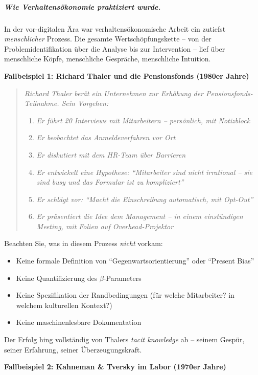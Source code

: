 \subparagraph{Wie Verhaltensökonomie praktiziert wurde.}

In der vor-digitalen Ära war verhaltensökonomische Arbeit ein zutiefst \textit{menschlicher} Prozess. Die gesamte Wertschöpfungskette -- von der Problemidentifikation über die Analyse bis zur Intervention -- lief über menschliche Köpfe, menschliche Gespräche, menschliche Intuition.

\textbf{Fallbeispiel 1: Richard Thaler und die Pensionsfonds (1980er Jahre)}

\begin{quote}
\textit{Richard Thaler berät ein Unternehmen zur Erhöhung der Pensionsfonds-Teilnahme. Sein Vorgehen:}
\begin{enumerate}
    \item \textit{Er führt 20 Interviews mit Mitarbeitern -- persönlich, mit Notizblock}
    \item \textit{Er beobachtet das Anmeldeverfahren vor Ort}
    \item \textit{Er diskutiert mit dem HR-Team über Barrieren}
    \item \textit{Er entwickelt eine Hypothese: ``Mitarbeiter sind nicht irrational -- sie sind busy und das Formular ist zu kompliziert''}
    \item \textit{Er schlägt vor: ``Macht die Einschreibung automatisch, mit Opt-Out''}
    \item \textit{Er präsentiert die Idee dem Management -- in einem einstündigen Meeting, mit Folien auf Overhead-Projektor}
\end{enumerate}
\end{quote}

Beachten Sie, was in diesem Prozess \textit{nicht} vorkam:
\begin{itemize}
    \item Keine formale Definition von ``Gegenwartsorientierung'' oder ``Present Bias''
    \item Keine Quantifizierung des $\beta$-Parameters
    \item Keine Spezifikation der Randbedingungen (für welche Mitarbeiter? in welchem kulturellen Kontext?)
    \item Keine maschinenlesbare Dokumentation
\end{itemize}

Der Erfolg hing vollständig von Thalers \textit{tacit knowledge} ab -- seinem Gespür, seiner Erfahrung, seiner Überzeugungskraft.

\textbf{Fallbeispiel 2: Kahneman \& Tversky im Labor (1970er Jahre)}

